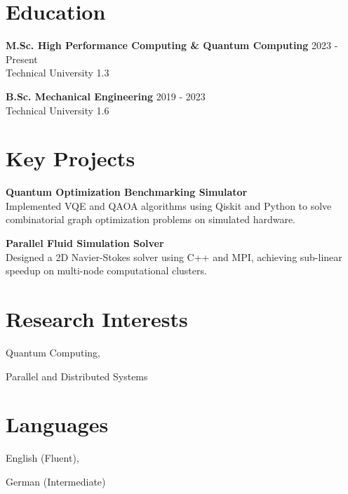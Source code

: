 \documentclass[11pt,a4paper]{article}
\begin{document}
\section{Education}

\textbf{ M.Sc. High Performance Computing & Quantum Computing } \hfill 2023 - Present\\
Technical University \hfill 1.3

\textbf{ B.Sc. Mechanical Engineering } \hfill 2019 - 2023\\
Technical University \hfill 1.6


\section{Key Projects}

\textbf{ Quantum Optimization Benchmarking Simulator }\\
Implemented VQE and QAOA algorithms using Qiskit and Python to solve combinatorial graph optimization problems on simulated hardware.

\textbf{ Parallel Fluid Simulation Solver }\\
Designed a 2D Navier-Stokes solver using C++ and MPI, achieving sub-linear speedup on multi-node computational clusters.


\section{Research Interests}

Quantum Computing, 

Parallel and Distributed Systems


\section{Languages}

English (Fluent), 

German (Intermediate)
\end{document}
